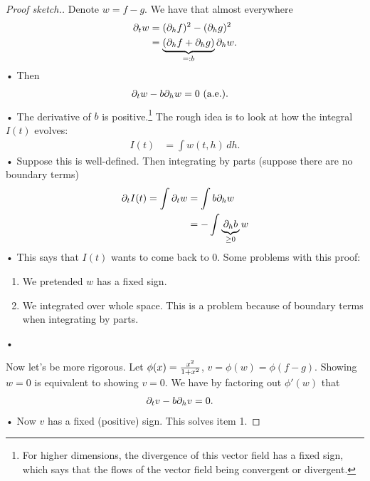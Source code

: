 \begin{proof}[Proof sketch.]
Denote $w=f-g$. We have that almost everywhere
\begin{align*}
\partial_t w&= (\partial_hf)^2 - (\partial_hg)^2\\
&= \underbrace{(\partial_h f+\partial_hg)}_{=:b} \partial_h w.
\end{align*}•
Then 
\begin{align*}
\partial_t w - b\partial_h w&=0\text{ (a.e.)}.
\end{align*}•
The derivative of $b$ is positive.\footnote{For higher dimensions, the divergence of this vector field has a fixed sign, which says that the flows of the vector field being convergent or divergent.}
The rough idea is to look at how the integral $I(t)$ evolves:
\begin{align*}
I(t) &= \int w(t,h)\,dh.
\end{align*}•
Suppose this is well-defined. Then integrating by parts (suppose there are no boundary terms)
\begin{align*}
\partial_t I(t) = \int\partial_t w &= \int b \partial_hw\\
&=-\int \underbrace{\partial_h b}_{\ge0} w
\end{align*}•
This says that $I(t)$ wants to come back to 0.
Some problems with this proof:
\begin{enumerate}
\item
We pretended $w$ has a fixed sign.
\item We integrated over whole space. This is a problem because of boundary terms when integrating by parts.
\end{enumerate}•

Now let's be more rigorous. Let $\phi(x) = \frac{x^2}{1+x^2}$, $v=\phi(w)=\phi(f-g)$. Showing $w=0$ is equivalent to showing $v=0$. We have by factoring out $\phi'(w)$ that %
\begin{align*}
\partial_t v - b\partial_h v&=0.
\end{align*}•
Now $v$ has a fixed (positive) sign. This solves item 1.


\end{proof}
